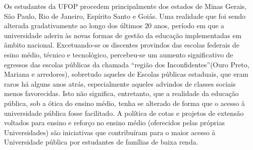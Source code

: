 \documentclass[
	12pt,				%
	openright,			%
	oneside,			%
	a4paper,			%
	english,			%
	brazil				%
	]{abntex2}
\begin{document}
Os estudantes da UFOP procedem principalmente dos estados de Minas Gerais, São Paulo, Rio de Janeiro, Espírito Santo e Goiás. Uma realidade que foi sendo alterada gradativamente ao longo dos últimos $20$ anos, período em que a universidade aderiu às novas formas de gestão da educação implementadas em âmbito nacional. Excetuando-se os discentes provindos das escolas federais de esino médio, técnico e tecnológico, percebeu-se um aumento significativo de egressos das escolas públicas da chamada ``região dos Inconfidentes''(Ouro Preto, Mariana e arredores), sobretudo aqueles de Escolas públicas estaduais, que eram raros há alguns anos atrás, especialmente aqueles advindos de classes sociais menos favorecidas. Isto não significa, entretanto, que a realidade da educação pública, sob a ótica do ensino médio, tenha se alterado de forma que o acesso à universidade pública fosse facilitado. A política de cotas e projetos de extensão voltados para ensino e reforço no ensino médio (oferecidos pelas próprias Universidades) são iniciativas que contribuíram para o maior acesso à Universidade pública por estudantes de famílias de baixa renda.
%
\end{document}
